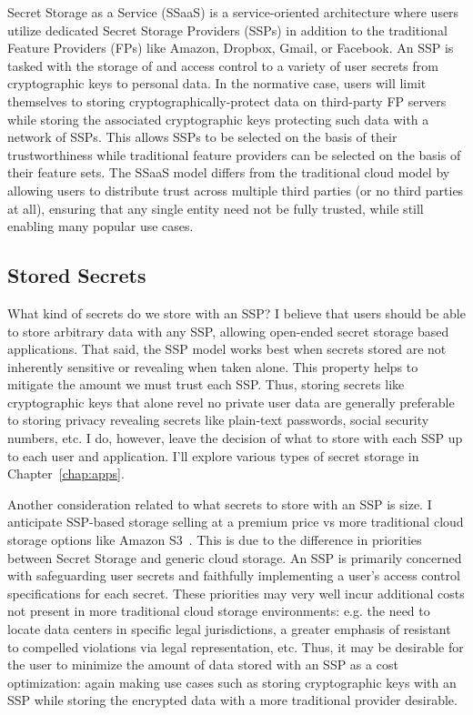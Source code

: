 Secret Storage as a Service (SSaaS) is a service-oriented architecture
where users utilize dedicated Secret Storage Providers (SSPs) in
addition to the traditional Feature Providers (FPs) like Amazon,
Dropbox, Gmail, or Facebook. An SSP is tasked with the storage of and
access control to a variety of user secrets from cryptographic keys to
personal data. In the normative case, users will limit themselves to
storing cryptographically-protect data on third-party FP servers while
storing the associated cryptographic keys protecting such data with a
network of SSPs. This allows SSPs to be selected on the basis of their
trustworthiness while traditional feature providers can be selected on
the basis of their feature sets. The SSaaS model differs from the
traditional cloud model by allowing users to distribute trust across
multiple third parties (or no third parties at all), ensuring that any
single entity need not be fully trusted, while still enabling many
popular use cases.

\subsection{Stored Secrets}

What kind of secrets do we store with an SSP? I believe that users
should be able to store arbitrary data with any SSP, allowing
open-ended secret storage based applications. That said, the SSP model
works best when secrets stored are not inherently sensitive or
revealing when taken alone. This property helps to mitigate the amount
we must trust each SSP. Thus, storing secrets like cryptographic keys
that alone revel no private user data are generally preferable to
storing privacy revealing secrets like plain-text passwords, social
security numbers, etc. I do, however, leave the decision of what to
store with each SSP up to each user and application. I'll explore
various types of secret storage in Chapter~\ref{chap:apps}.

Another consideration related to what secrets to store with an SSP is
size. I anticipate SSP-based storage selling at a premium price vs
more traditional cloud storage options like Amazon
S3~\cite{amazon-s3}. This is due to the difference in priorities
between Secret Storage and generic cloud storage. An SSP is primarily
concerned with safeguarding user secrets and faithfully implementing a
user's access control specifications for each secret. These priorities
may very well incur additional costs not present in more traditional
cloud storage environments: e.g. the need to locate data centers in
specific legal jurisdictions, a greater emphasis of resistant to
compelled violations via legal representation, etc. Thus, it may be
desirable for the user to minimize the amount of data stored with an
SSP as a cost optimization: again making use cases such as storing
cryptographic keys with an SSP while storing the encrypted data with a
more traditional provider desirable.

